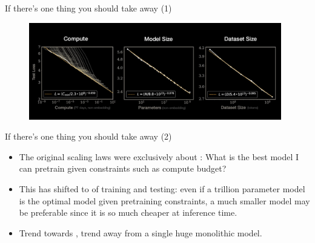 \begin{vbframe}{If there's one thing you should take away (1)}

\vfill

\begin{figure}
	\centering
	\includegraphics[width = 11cm]{./figure/3thingserrorratescaleswith.png} \\ 
\end{figure}

\vfill

\end{vbframe}

\begin{vbframe}{If there's one thing you should take away (2)}


\vfill

\begin{itemize}
	\item The original scaling laws were exclusively
        about : What is the best model
        I can pretrain given
        constraints such as compute budget?

\item This has shifted to  of training
        and testing: even if a trillion parameter model is the optimal
        model given pretraining constraints, a much smaller
        model may be preferable since it is so much cheaper at
        inference time.

\item Trend towards , trend away
        from a single huge monolithic model.

\end{itemize}

\vfill

\end{vbframe}


